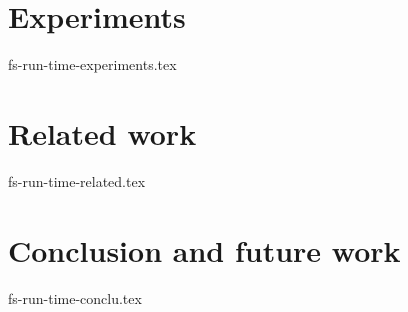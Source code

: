\documentclass[14pt]{matmex-diploma-custom}
\theoremstyle{remark}
\begin{document}
\section {Experiments}
 {fs-run-time-experiments.tex}

\section {Related work}
 {fs-run-time-related.tex}

\section {Conclusion and future work}
 {fs-run-time-conclu.tex}

\setmonofont[Mapping=tex-text]{CMU Typewriter Text}


\end{document}
